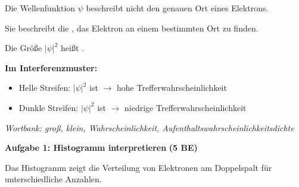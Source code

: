 \documentclass[11pt,a4paper]{article}
\newcommand{\luecke}[1]{\underline{\hspace{#1}}}
\begin{document}
\vspace{0.6em}


\begin{tcolorbox}[kasten={Kasten 2: Die Wahrscheinlichkeitswelle}]

Die Wellenfunktion $\psi$ beschreibt nicht den genauen Ort eines Elektrons.

Sie beschreibt die \luecke{3cm}, das Elektron an einem bestimmten Ort zu finden.

\vspace{0.5em}

Die Größe $|\psi|^2$ heißt \luecke{5cm}.

\vspace{0.8em}

\textbf{Im Interferenzmuster:}
\begin{itemize}[leftmargin=1.5cm, itemsep=2pt]
\item Helle Streifen: $|\psi|^2$ ist \luecke{2cm} $\rightarrow$ hohe Trefferwahrscheinlichkeit
\item Dunkle Streifen: $|\psi|^2$ ist \luecke{2cm} $\rightarrow$ niedrige Trefferwahrscheinlichkeit
\end{itemize}

\vspace{0.3em}
{\small\textit{Wortbank: groß, klein, Wahrscheinlichkeit, Aufenthaltswahrscheinlichkeitsdichte}}
\end{tcolorbox}

\vspace{1em}


{\large\textbf{Aufgabe 1: Histogramm interpretieren}} \hfill \textbf{(5 BE)}

\vspace{0.5em}

Das Histogramm zeigt die Verteilung von Elektronen am Doppelspalt für unterschiedliche Anzahlen.
\end{document}
